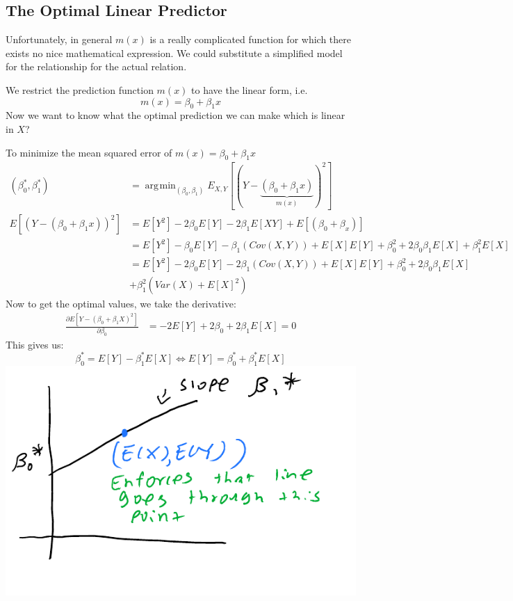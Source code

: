 \documentclass[12 pt]{article}
\DeclareMathOperator*{\argmin}{arg\!\min}
\begin{document}
\subsection{The Optimal Linear Predictor}
Unfortunately, in general $m(x)$ is a really complicated function for
which there exists no nice mathematical expression. We could
substitute a simplified model for the relationship for
the actual relation.

We restrict the prediction function $m(x)$ to have the linear form,
i.e.\ $$m(x) = \beta_0 + \beta_1 x$$
Now we want to know what the optimal prediction we can make which is
linear in $X$?

To minimize the mean squared error of $m(x) = \beta_0 + \beta_1 x$
\begin{align*}
  (\beta_0^*, \beta_1^*) & = \argmin_{(\beta_0, \beta_1)} E_{X, Y}[(Y - \underbrace{(\beta_0 + \beta_1 x)}_{m(x)})^2]
  \\ E[(Y - (\beta_0 + \beta_1 x))^2] & = E[Y^2] - 2 \beta_0 E[Y] - 2 \beta_1 E[XY] + E [ (\beta_0 + \beta_x)]
  \\ & = E [Y^2] - \beta_0 E[Y] -  \beta_1 (Cov (X,Y)) + E[X]E[Y] + \beta_0^2 + 2\beta_0\beta_1 E[X] + \beta_1^2 E[X]
  \\ & = E[Y^2] - 2 \beta_0 E[Y] - 2 \beta_1 (Cov(X,Y)) + E[X]E[Y] + \beta_0^2 + 2 \beta_0 \beta_1 E[X]
  \\ & + \beta_1^2 (Var(X) + E[X]^2)
\end{align*}
Now to get the optimal values, we take the derivative:
\begin{align*}
  \frac{\partial{E[Y - (\beta_0+\beta_1X)^2]}}{\partial{\beta_0}} & = -2E[Y] + 2 \beta_0 + 2\beta_1 E[X] = 0
\end{align*}
This gives us:
$$\beta_0^* = E[Y] - \beta_1^* E[X] \iff E[Y] = \beta_0^* + \beta_1^*
E[X]$$
\includegraphics[width=.9\textwidth]{2.pdf}
\end{document}
